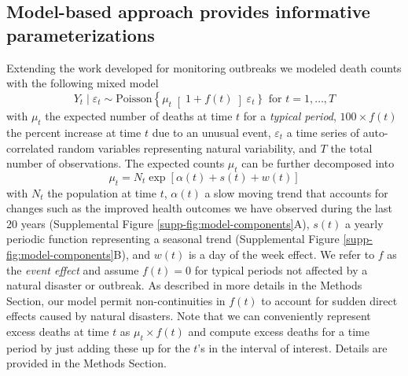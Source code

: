 \documentclass[11pt]{article}
\begin{document}
\subsection{Model-based approach provides informative parameterizations}
\label{subsec:model-based}
Extending the work developed for monitoring outbreaks \cite{farrington1996statistical,hohle2008count,noufaily2013improved,salmon2016monitoring} we modeled death counts with the following mixed model
\begin{equation}
    Y_t \mid \varepsilon_t \sim 
    \mbox{Poisson}\left\{ \mu_t \right[1 + f(t) \left]  \varepsilon_t \right\} \mbox{ for } t = 1, \dots,T
\end{equation}
with $\mu_t$ the expected number of deaths at time $t$ for a \emph{typical period}, $100 \times f(t)$ the percent increase at time $t$ due to an unusual event, $\varepsilon_t$ a time series of auto-correlated random variables representing natural variability, and $T$ the total number of observations. The expected counts $\mu_t$ can be further decomposed into 
\begin{equation}
    \mu_t =N_t \exp[\alpha(t) + s(t) + w(t)]
    \label{eq:mean-model}
\end{equation}
with $N_t$ the population at time $t$, $\alpha(t)$ a slow moving trend that accounts for changes such as the improved health outcomes we have observed during the last 20 years (Supplemental Figure \ref{supp-fig:model-components}A), $s(t)$ a yearly periodic function representing a seasonal trend (Supplemental Figure \ref{supp-fig:model-components}B), and $w(t)$ is a day of the week effect. We refer to $f$ as the \emph{event effect} and assume $f(t) = 0$ for typical periods not affected by a natural disaster or outbreak. As described in more details in the Methods Section, our model permit non-continuities in $f(t)$ to account for sudden direct effects caused by natural disasters. Note that we can conveniently represent excess deaths at time $t$ as $\mu_t \times f(t)$ and compute excess deaths for a time period by just adding these up for the $t$'s in the interval of interest. 
Details are provided in the Methods Section.
\end{document}
